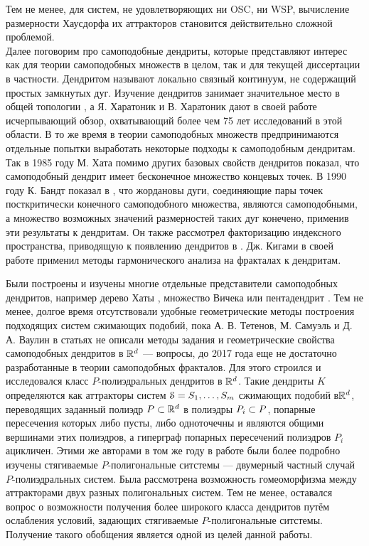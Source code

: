 Тем не менее, для систем, не удовлетворяющих ни OSC, ни WSP, вычисление размерности Хаусдорфа их аттракторов становится действительно сложной проблемой.\\

Далее поговорим про самоподобные дендриты, которые представляют интерес как для теории самоподобных множеств в целом, так и для текущей диссертации в частности.
Дендритом называют локально связный континуум, не содержащий простых замкнутых дуг.
Изучение дендритов занимает значительное место в общей топологии \cite{Kur1, Kur2}, а Я. Харатоник и В. Харатоник дают в своей работе \cite{Char1998} исчерпывающий обзор, охватывающий более чем 75 лет исследований в этой области.
В то же время в теории самоподобных множеств предпринимаются отдельные попытки выработать некоторые подходы к самоподобным дендритам.
Так в 1985 году М. Хата \cite{Hata1985} помимо других базовых свойств дендритов показал, что самоподобный дендрит имеет бесконечное множество концевых точек.
В 1990 году К. Бандт показал в \cite{SSS6}, что жордановы дуги, соединяющие пары точек посткритически конечного самоподобного множества, являются самоподобными, а множество возможных значений размерностей таких дуг конечено, применив эти результаты к дендритам.
Он также рассмотрел факторизацию индексного пространства, приводящую к появлению дендритов в \cite{SSS2}.
Дж. Кигами в своей работе \cite{Kig95} применил методы гармонического анализа на фракталах к дендритам. 

Были построены и изучены многие отдельные представители самоподобных дендритов, например дерево Хаты \cite{Hata1985}, множество Вичека или пентадендрит \cite{McWorter1987}.
Тем не менее, долгое время отсутствовали удобные геометрические методы построения подходящих систем сжимающих подобий, пока А. В. Тетенов, М. Самуэль и Д. А. Ваулин в статьях \cite{TSV2017} не описали методы задания и геометрические свойства самоподобных дендритов в $\mathbb{R}^d$ --- вопросы, до 2017 года еще не достаточно разработанные в теории самоподобных фракталов. 
Для этого строился и исследовался класс $P$-полиэдральных дендритов в $\mathbb{R}^d$. 
Такие дендриты $K$ определяются как аттракторы систем ${\EuScript S} = {S_1,\ldots, S_m}$ сжимающих подобий в$\mathbb{R}^d$, переводящих заданный полиэдр $P \subset \mathbb{R}^d$ в полиэдры $P_i \subset P$, попарные пересечения которых либо пусты, либо одноточечны и являются общими вершинами этих полиэдров, а гиперграф попарных пересечений полиэдров $P_i$ ацикличен.
Этими же авторами в том же году в работе \cite{STV2017} были более подробно изучены стягиваемые $P$-полигональные ситстемы --- двумерный частный случай $P$-полиэдральных систем.
Была рассмотрена возможность гомеоморфизма между аттракторами двух разных полигональных систем.
Тем не менее, оставался вопрос о возможности получения более широкого класса дендритов путём ослабления условий, задающих стягиваемые $P$-полигональные ситстемы. 
Получение такого обобщения является одной из целей данной работы.

